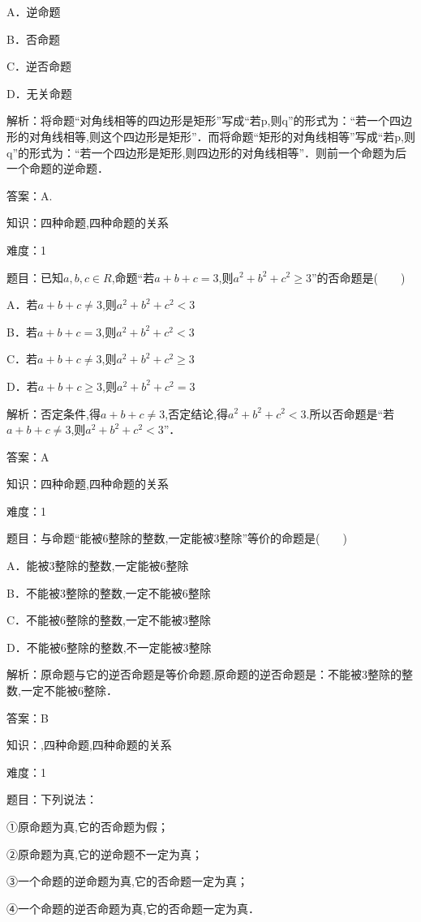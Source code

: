 \documentclass{article} %
\begin{document}
A．逆命题   

B．否命题

C．逆否命题   

D．无关命题

解析：将命题``对角线相等的四边形是矩形''写成``若p,则q''的形式为：``若一个四边形的对角线相等,则这个四边形是矩形''．而将命题``矩形的对角线相等''写成``若p,则q''的形式为：``若一个四边形是矩形,则四边形的对角线相等''．则前一个命题为后一个命题的逆命题．

答案：A.



知识：四种命题,四种命题的关系

难度：1

题目：已知$a,b,c\in R$,命题``若$a+b+c=3$,则$a^{2}+b^{2}+c^{2}\ge 3$''的否命题是(　　)

A．若$a+b+c\neq 3$,则$a^{2}+b^{2}+c^{2}<3$

B．若$a+b+c=3$,则$a^{2}+b^{2}+c^{2}<3$

C．若$a+b+c\neq 3$,则$a^{2}+b^{2}+c^{2}\ge 3$

D．若$a+b+c\ge 3$,则$a^{2}+b^{2}+c^{2}=3$

解析：否定条件,得$a+b+c\ne 3$,否定结论,得$a^{2}+b^{2}+c^{2}<3$.所以否命题是``若$a+b+c\neq3$,则$a^{2}+b^{2}+c^{2}<3$''．

答案：A



知识：四种命题,四种命题的关系

难度：1

题目：与命题``能被6整除的整数,一定能被3整除''等价的命题是(　　)

A．能被3整除的整数,一定能被6整除

B．不能被3整除的整数,一定不能被6整除

C．不能被6整除的整数,一定不能被3整除

D．不能被6整除的整数,不一定能被3整除

解析：原命题与它的逆否命题是等价命题,原命题的逆否命题是：不能被3整除的整数,一定不能被6整除．

答案：B



知识：,四种命题,四种命题的关系

难度：1

题目：下列说法：

①原命题为真,它的否命题为假；

②原命题为真,它的逆命题不一定为真；

③一个命题的逆命题为真,它的否命题一定为真；

④一个命题的逆否命题为真,它的否命题一定为真．
\end{document}
